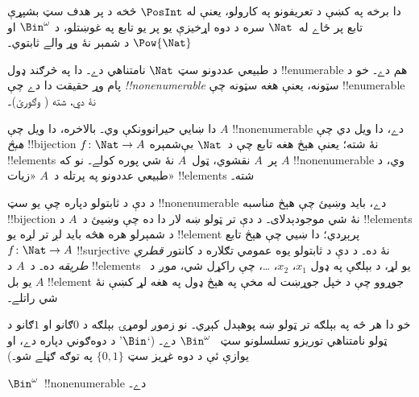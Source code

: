 \documentclass[../../../include/open-logic-section]{subfiles}
\begin{document}


\begin{editorial}
  دا برخه په  کښې د تعريفونو په کارولو، يعنې
  له $\PosInt$ څخه د پر هدف سټ بشپړې تابع پر ځاے له~$\Nat$ سره
  د دوه اړخيزې يو پر يو تابع په غوښتلو، د $\Bin^\omega$ او
  $\Pow{\Nat}$ د شمېر نۀ وړ والے ثابتوي۔
\end{editorial}

\begin{explain}
د طبيعي عددونو سټ $\Nat$ نامتناهي دے۔ دا په څرګند ډول
!!{enumerable} هم دے۔ خو د پام وړ حقيقت دا دے چې
\emph{!!{nonenumerable}} سټونه، يعنې هغه سټونه چې !!{enumerable}
نۀ دي، شته ( وګورئ)۔

دا ښايي حيرانوونکې وي۔ بالاخره، دا ويل چې $A$ !!{nonenumerable}
دے، دا ويل دي چې \emph{هېڅ} !!{bijection}
$f \colon \Nat \to A$ نۀ شته؛ يعنې هېڅ هغه تابع چې د~$\Nat$
بې‌شمېره !!{element}s پر~$A$ نقشوي، ټول~$A$ نۀ شي پوره کولے۔
نو که $A$ !!{nonenumerable} وي، د طبيعي عددونو په پرتله د~$A$
«زيات» !!{element}s شته۔

د دې د ثابتولو دپاره چې يو سټ !!{nonenumerable} دے، بايد وښيئ چې هېڅ
مناسبه !!{bijection} نۀ شي موجودېدلای۔ د دې تر ټولو ښه لار دا ده
چې وښيئ د~$A$ د !!{element}s د شمېرلو هره هڅه بايد لږ تر لږه يو
!!{element} پرېږدي؛ دا ښيي چې هېڅ تابع $f\colon \Nat \to A$
!!{surjective} نۀ ده۔ د دې د ثابتولو يوه عمومي تګلاره د کانتور
\emph{قطري طريقه} ده۔ د~$A$ د !!{element}s يو لړ، د بېلګې په
ډول $x_1$، $x_2$، \dots، چې راکړل شي، موږ د~$A$ يو بل
!!{element} جوړوو چې د خپل جوړښت له مخې په هېڅ ډول په هغه لړ
کښې نۀ شي راتلے۔

خو دا هر څه په بېلګه تر ټولو ښه پوهېدل کېږي۔ نو زموږ لومړۍ
بېلګه د $0$ګانو او $1$ګانو د ټولو نامتناهي توريزو تسلسلونو سټ
~$\Bin^\omega$ دے۔ (`$\Bin$' د دوه‌ګوني دپاره دے، او يوازې ئې د
دوه غړيز سټ $\{0,1\}$ په توګه ګڼلے شو۔)
\end{explain}

\begin{thm}
$\Bin^\omega$~!!{nonenumerable} دے۔
\end{thm}
\end{document}

